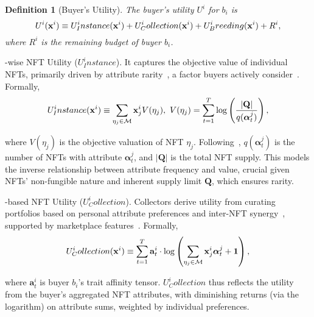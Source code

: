 \documentclass[conference]{IEEEtran}
\theoremstyle{plain}
\newtheorem{definition}{Definition}
\newcommand*{\defeq}{\equiv}
\begin{document}
\begin{definition}[Buyer's Utility]    
    \label{def:buyer-utility}
    The buyer's utility $U^i$ for $b_i$ is
    \begin{equation}\small
        \label{eqn:buyer-utility}
        U^i(\mathbf{x}^i) \defeq U^i_Instance(\mathbf{x}^i) + U^i_Collection(\mathbf{x}^i) + U^i_Breeding(\mathbf{x}^i) + R^i,
    \end{equation}
    where $R^i$ is the remaining budget of buyer $b_i$.
\end{definition}

\noindentInstance-wise NFT Utility ($U^i_Instance$). It captures the objective value of individual NFTs, primarily driven by attribute rarity~\cite{costa2023show}, a factor buyers actively consider~. Formally,
\begin{equation}\small
    \label{eqn:instance-utility}
    U^i_Instance(\mathbf{x}^i) \defeq \sum_{\eta_j\in\mathcal{M}} \mathbf{x}^i_j V(\eta_j),\,\, V(\eta_j) = \sum_{t=1}^{T}\log\left(\frac{|\mathbf{Q}|}{q(\bm{\alpha}^j_t)}\right),
\end{equation}

where $V(\eta_j)$ is the objective valuation of NFT $\eta_j$. Following~\cite{mekacher2022heterogeneous}, $q(\bm{\alpha}^j_t)$ is the number of NFTs with attribute $\bm{\alpha}^j_t$, and $|\mathbf{Q}|$ is the total NFT supply. This models the inverse relationship between attribute frequency and value, crucial given NFTs' non-fungible nature and inherent supply limit $\mathbf{Q}$, which ensures rarity.

\noindentCollection-based NFT Utility ($U^i_Collection$). Collectors derive utility from curating portfolios based on personal attribute preferences and inter-NFT synergy~\cite{hofstetter2024beyond}, supported by marketplace features~. Formally,
\begin{equation}\small
    \label{eqn:collection-utility}
    U^i_Collection(\mathbf{x}^i)\defeq \sum_{t=1}^T \mathbf{a}^i_t \cdot\log \left(\sum_{\eta_j\in\mathcal{M}} \mathbf{x}^i_j \bm{\alpha}^j_t + \mathbf{1}\right),
\end{equation}

where $\mathbf{a}^i_t$ is buyer $b_i$'s trait affinity tensor. $U^i_Collection$ thus reflects the utility from the buyer's aggregated NFT attributes, with diminishing returns (via the logarithm) on attribute sums, weighted by individual preferences.
\end{document}
